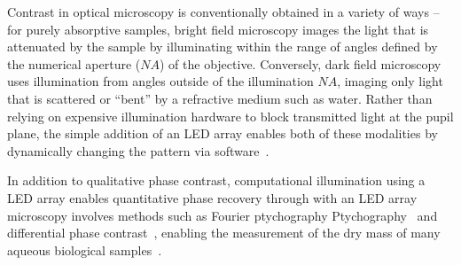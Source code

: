 Contrast in optical microscopy is conventionally obtained in a variety of ways – for purely absorptive samples, bright field microscopy images the light that is attenuated by the sample by illuminating within the range of angles defined by the numerical aperture ($NA$) of the objective. Conversely, dark field microscopy uses illumination from angles outside of the illumination $NA$, imaging only light that is scattered or “bent” by a refractive medium such as water. Rather than relying on expensive illumination hardware to block transmitted light at the pupil plane, the simple addition of an LED array enables both of these modalities by dynamically changing the pattern via software~\cite{Zheng2011, zijiMulti}.


In addition to qualitative phase contrast, computational illumination using a LED array enables quantitative phase recovery through with an LED array microscopy involves methods such as Fourier ptychography Ptychography~\cite{Zheng2013, Tian14} and differential phase contrast~\cite{mehta2009quantitative,
tian2015quantitative}, enabling the measurement of the dry mass of many aqueous biological samples~\cite{popescu2008imaging, popescu2008optical}. 

